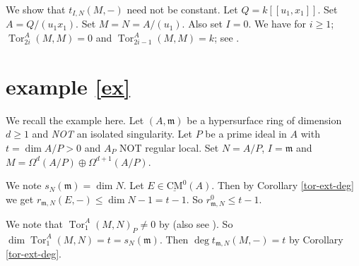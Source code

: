 \documentclass{amsart}
\newcommand{\m}{\mathfrak{m} }
\newcommand{\Tor}{\operatorname{Tor}}
\newcommand{\CMS}{\operatorname{\underline{CM}}}
\theoremstyle{plain}
\theoremstyle{definition}
\theoremstyle{remark}
\begin{document}
\s \label{lucho} We show that $t_{I, N}(M , -)$ need not be constant. Let $Q = k[[u_1, x_1]]$. Set $A = Q/(u_1x_1)$. Set $M = N = A/(u_1)$. Also set $I = 0$. We have for $i \geq 1$;
$\Tor^A_{2i}(M, M) = 0$ and $\Tor^A_{2i-1}(M, M) = k$; see \cite[4.3]{AB}.
\section{example \ref{ex}}
We recall the example here.
Let $(A, \m)$ be a hypersurface ring of dimension $d \geq 1$ and \emph{NOT} an isolated singularity. Let $P$ be a prime ideal in $A$ with $t = \dim A/P > 0$ and $A_P$ NOT regular local.
Set $N = A/P$, $I = \m$ and $M = \Omega^{d}(A/P) \oplus \Omega^{d+1}(A/P)$.

We note $s_N(\m) = \dim N$. Let $E \in \CMS^0(A)$. Then by Corollary \ref{tor-ext-deg} we get $r_{\m, N}(E, -) \leq \dim N - 1 = t -1$. So $r_{\m, N}^0 \leq t -1$.

We note that $\Tor^A_1(M, N)_P \neq 0$ by  \cite[1.9]{HW} (also see \cite[1.1]{M}). So \\ $\dim \Tor^A_1(M, N) = t = s_N(\m)$.
Then $\deg t_{\m, N}(M, -) = t$ by  Corollary \ref{tor-ext-deg}.
\end{document}
